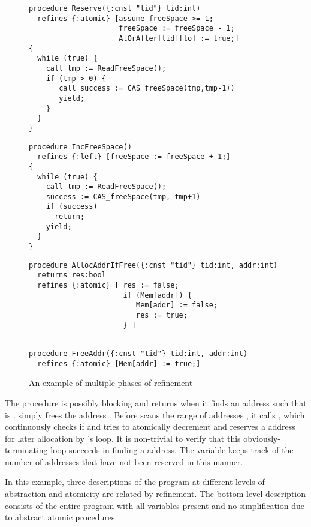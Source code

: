 \begin{figure}
\begin{small}
\begin{verbatim}
procedure Reserve({:cnst "tid"} tid:int) 
  refines {:atomic} [assume freeSpace >= 1; 
                     freeSpace := freeSpace - 1;
                     AtOrAfter[tid][lo] := true;]
{
  while (true) {
    call tmp := ReadFreeSpace();
    if (tmp > 0) {
       call success := CAS_freeSpace(tmp,tmp-1)) 
       yield;
    }
  }
}
\end{verbatim}
\begin{verbatim}
procedure IncFreeSpace() 
  refines {:left} [freeSpace := freeSpace + 1;]
{
  while (true) {
    call tmp := ReadFreeSpace();
    success := CAS_freeSpace(tmp, tmp+1)
    if (success)  
      return;
    yield;
  }
}
\end{verbatim}
\begin{verbatim}
procedure AllocAddrIfFree({:cnst "tid"} tid:int, addr:int) 
  returns res:bool
  refines {:atomic} [ res := false;
                      if (Mem[addr]) {
                         Mem[addr] := false; 
                         res := true;
                      } ]
                    
\end{verbatim}
\begin{verbatim}
procedure FreeAddr({:cnst "tid"} tid:int, addr:int)
  refines {:atomic} [Mem[addr] := true;]
\end{verbatim}
\end{small}
\caption{An example of multiple phases of refinement}
\label{fig:refinementBot}
\end{figure}

The  procedure is possibly blocking and returns when it
finds an address  such that  is
.  simply frees the address
. 
Before  scans the range of addresses
\exC{[lo,hi]}, it calls , which continuously checks if
 and tries to atomically decrement 
and reserves a  address for later allocation by
's  loop. It is non-trivial to verify that this
obviously-terminating  loop succeeds in finding a
 address. The variable  keeps track of the
number of  addresses that have not been reserved in this
manner. 

In this example, three descriptions of the program at different levels
of abstraction and atomicity are related by refinement. 
The bottom-level description consists of the entire program with all
variables present and no simplification due to abstract atomic
procedures. 

